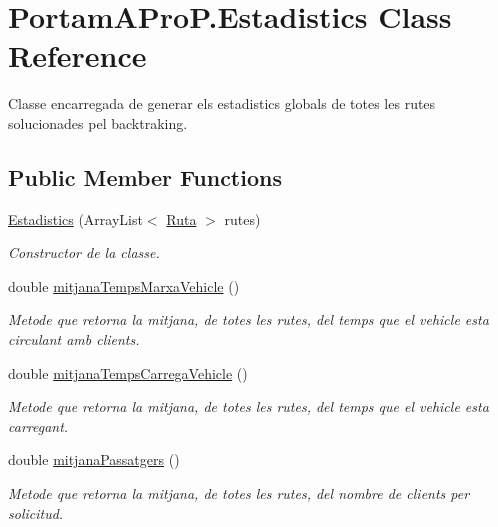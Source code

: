 \hypertarget{class_portam_a_pro_p_1_1_estadistics}{}\section{Portam\+A\+Pro\+P.\+Estadistics Class Reference}
\label{class_portam_a_pro_p_1_1_estadistics}


Classe encarregada de generar els estadistics globals de totes les rutes solucionades pel backtraking.  


\subsection*{Public Member Functions}
\begin{DoxyCompactItemize}
\item 
\hyperlink{class_portam_a_pro_p_1_1_estadistics_a94e45c99d004023042769c71eed2fd1e}{Estadistics} (Array\+List$<$ \hyperlink{class_portam_a_pro_p_1_1_ruta}{Ruta} $>$ rutes)
\begin{DoxyCompactList}\small\item\em Constructor de la classe. \end{DoxyCompactList}\item 
double \hyperlink{class_portam_a_pro_p_1_1_estadistics_a6c53fd82b51c9383aa70b876d5ac7eb0}{mitjana\+Temps\+Marxa\+Vehicle} ()
\begin{DoxyCompactList}\small\item\em Metode que retorna la mitjana, de totes les rutes, del temps que el vehicle esta circulant amb clients. \end{DoxyCompactList}\item 
double \hyperlink{class_portam_a_pro_p_1_1_estadistics_ae909ba27083df99420a17cc0b47c9e81}{mitjana\+Temps\+Carrega\+Vehicle} ()
\begin{DoxyCompactList}\small\item\em Metode que retorna la mitjana, de totes les rutes, del temps que el vehicle esta carregant. \end{DoxyCompactList}\item 
double \hyperlink{class_portam_a_pro_p_1_1_estadistics_add8b72d2f0eda3a89215e913a1d2db0f}{mitjana\+Passatgers} ()
\begin{DoxyCompactList}\small\item\em Metode que retorna la mitjana, de totes les rutes, del nombre de clients per solicitud. \end{DoxyCompactList}\item 

\end{DoxyCompactItemize}
